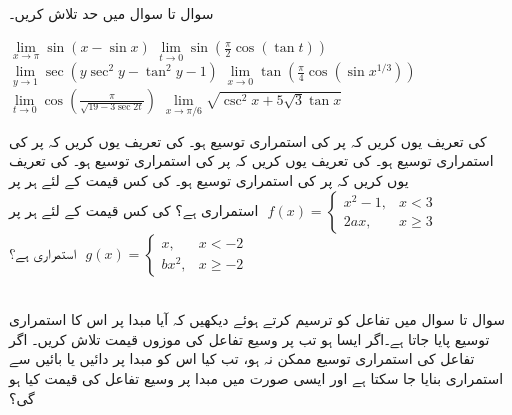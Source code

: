 \\
سوال  تا سوال  میں حد تلاش کریں۔

$\lim\limits_{x\to \pi} \sin(x-\sin x)$
$\lim\limits_{t\to 0} \sin(\tfrac{\pi}{2}\cos (\tan t))$
$\lim\limits_{y\to 1} \sec(y\sec^2 y-\tan^2 y-1)$
$\lim\limits_{x\to 0} \tan(\tfrac{\pi}{4}\cos(\sin x^{1/3}))$
$\lim\limits_{t\to 0} \cos(\tfrac{\pi}{\sqrt{19-3\sec 2t}})$
$\lim\limits_{x\to \pi/6} \sqrt{\csc^2 x+5\sqrt{3}\tan x}$

 کی تعریف یوں کریں کہ  پر  کی  استمراری توسیع  ہو۔
 کی تعریف یوں کریں کہ  پر  کی  استمراری توسیع  ہو۔
 کی تعریف یوں کریں کہ  پر  کی  استمراری توسیع  ہو۔
 کی تعریف یوں کریں کہ  پر  کی  استمراری توسیع  ہو۔
 کی کس قیمت کے لئے ہر  پر 
$\,\,f(x)=\begin{cases} x^2-1,&x<3\\ 2ax,&x\ge 3  \end{cases}\,\,$
استمراری ہے؟
 کی کس قیمت کے لئے ہر  پر 
$\,\,g(x)=\begin{cases} x,&x<-2\\ bx^2,&x\ge -2  \end{cases}\,\,$
استمراری ہے؟

\\
سوال  تا سوال  میں تفاعل  کو ترسیم کرتے ہوئے دیکھیں کہ آیا  مبدا پر اس کا استمراری توسیع پایا جاتا ہے۔اگر ایسا ہو تب  پر وسیع تفاعل کی موزوں قیمت تلاش کریں۔ اگر تفاعل کی استمراری توسیع  ممکن نہ ہو، تب کیا اس کو مبدا پر دائیں یا بائیں سے استمراری بنایا جا سکتا ہے اور ایسی صورت میں مبدا پر وسیع تفاعل کی قیمت کیا ہو گی؟

